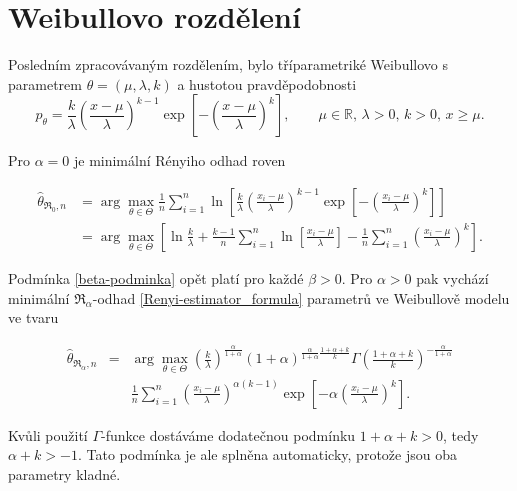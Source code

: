 \section{Weibullovo rozdělení} %

Posledním zpracovávaným rozdělením, bylo tříparametriké Weibullovo s parametrem $\theta = (\mu,\lambda,k)$ a hustotou pravděpodobnosti
\begin{equation}
	p_\theta =  \frac{k}{\lambda} \left( \frac{x-\mu}{\lambda} \right)^{k-1} \exp \left[ -\left( \frac{x-\mu}{\lambda} \right)^k \right], \qquad \mu \in \mathbb{R}, \, \lambda>0, \, k>0, \, x \geq \mu.
\end{equation}

\noindent Pro $\alpha = 0$ je minimální Rényiho odhad roven

\begin{align}
	\hat{\theta}_{\mathfrak{R}_0,n} & = \arg \max_{\theta \in \Theta} \frac{1}{n} \sum^n_{i=1} \ln \left[ \frac{k}{\lambda} \left( \frac{x_i-\mu}{\lambda} \right)^{k-1} 
	\exp \left[ -\left( \frac{x_i-\mu}{\lambda} \right)^k \right]\right] \nonumber \\
	&=\arg \max_{\theta \in \Theta}\left[ \ln \frac{k}{\lambda} + \frac{k-1}{n} \sum^n_{i=1} \ln \left[  \frac{x_i-\mu}{\lambda} \right] - 
	\frac{1}{n} \sum^n_{i=1} \left(  \frac{x_i-\mu}{\lambda} \right)^k \right].
\end{align}

\noindent Podmínka \ref{beta-podminka} opět platí pro každé $\beta>0$. Pro $\alpha>0$ pak vychází minimální $\mathfrak{R}_\alpha$-odhad \eqref{Renyi-estimator_formula} parametrů ve Weibullově modelu ve tvaru

\begin{eqnarray}
	\hat{\theta}_{\mathfrak{R}_\alpha,n} & = & \arg \max_{\theta \in \Theta} \left( \frac{k}{\lambda} \right)^\frac{\alpha}{1+\alpha} (1+\alpha)^{\frac{\alpha}{1+\alpha}\frac{1+\alpha+k}{k}} 
	\Gamma\left(\frac{1+\alpha+k}{k}\right)^{-\frac{\alpha}{1+\alpha}} \nonumber \\
	&& \frac{1}{n}\sum_{i=1}^n \left( \frac{x_i-\mu}{\lambda}\right)^{\alpha(k-1)} \exp\left[-\alpha \left(\frac{x_i-\mu}{\lambda}\right)^k\right].
\end{eqnarray}

\noindent Kvůli použití $\Gamma$-funkce dostáváme dodatečnou podmínku $1+\alpha+k>0$, tedy $\alpha + k > -1$. Tato podmínka je ale splněna automaticky, protože jsou oba parametry kladné. 


